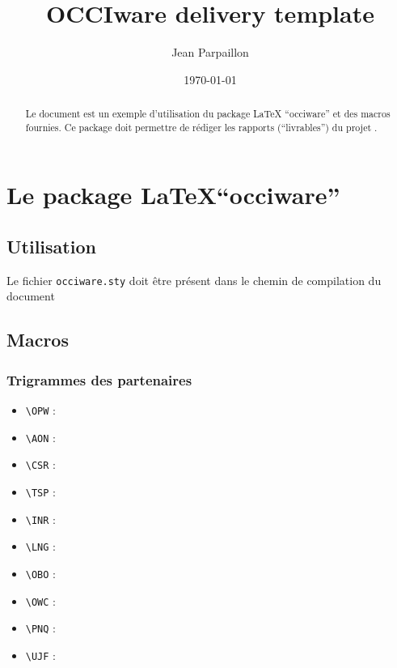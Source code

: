 \documentclass[a4paper,11pt]{report}
\begin{document}
\title{OCCIware delivery template}

\author{Jean Parpaillon}


\date{\today}

\maketitle

\begin{abstract}
  Le document est un exemple d'utilisation du package \LaTeX
  ``occiware'' et des macros fournies. Ce package doit permettre de
  rédiger les rapports (``livrables'') du projet \occiware.
\end{abstract}

\chapter{Le package \LaTeX ``occiware''}
\label{chap:one}

\section{Utilisation}
\label{sec:utilisation}

Le fichier \texttt{occiware.sty} doit être présent dans le chemin de
compilation du document

\section{Macros}
\label{sec:macros}

\subsection{Trigrammes des partenaires}

\begin{itemize}
\item \verb+\OPW+ : \OPW
\item \verb+\AON+ : \AON
\item \verb+\CSR+ : \CSR
\item \verb+\TSP+ : \TSP
\item \verb+\INR+ : \INR
\item \verb+\LNG+ : \LNG
\item \verb+\OBO+ : \OBO
\item \verb+\OWC+ : \OWC
\item \verb+\PNQ+ : \PNQ
\item \verb+\UJF+ : \UJF
\end{itemize}


\end{document}
